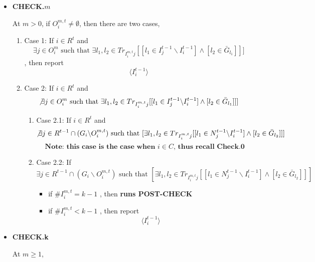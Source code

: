 \documentclass[12pt]{article}
\theoremstyle{remark}
\theoremstyle{remark}
\begin{document}
\begin{itemize}
\begin{enumerate}
\begin{itemize}
\end{itemize}
\end{enumerate}




\item \textbf{CHECK.$m$}

 At $m>0$, if $O^{m,t}_i\neq \emptyset$, then there are two cases, 
\begin{enumerate}
\item Case 1: If $i\in R^t$ and 
\[\exists j\in  O^m_i \text{ such that }\exists l_1,l_2\in Tr_{I^{m,t}_ij}[[l_1\in I^{t-1}_j\backslash I^{t-1}_i] \wedge [l_2\in \bar{G}_{l_1}]]]\]
, then report 
\[\langle I^{t-1}_i \rangle\]
\item Case 2: If $i\in R^t$ and 
\[\not\exists j\in  O^m_i \text{ such that }\exists l_1,l_2\in Tr_{I^{m,t}_ij}[[l_1\in I^{t-1}_j\backslash I^{t-1}_i] \wedge [l_2\in \bar{G}_{l_1}]]]\]

\begin{enumerate}
\item Case 2.1: If $i\in R^t$ and 
\[\not\exists j\in R^{t-1}\cap (G_i\backslash  O^{m,t}_i) \text{ such that }[\exists l_1,l_2\in Tr_{I^{m,t}_ij}[[l_1\in N^{t-1}_j\backslash I^{t-1}_i] \wedge [l_2\in \bar{G}_{l_2}]]]\]
\[\textbf{Note: this case is the case when $i\in C$, thus recall Check.0}\]

\item Case 2.2: If 
\[\exists j\in R^{t-1}\cap (G_i\backslash  O^{m,t}_i) \text{ such that }[\exists l_1,l_2\in Tr_{I^{m,t}_ij}[[l_1\in N^{t-1}_j\backslash I^{t-1}_i] \wedge [l_2\in \bar{G}_{l_2}]]]\]

\begin{itemize}
\item if $\# I^{m,t}_i= k-1$
, then 
\textbf{runs POST-CHECK }

\item if $\# I^{m,t}_i< k-1$
, then report 
\[\langle I^{t-1}_i \rangle\]
\end{itemize}





\end{enumerate}

\end{enumerate}





\item \textbf{CHECK.k}

At $m\geq 1$, 
\begin{enumerate}



\end{enumerate}
\end{itemize}
\end{document}
